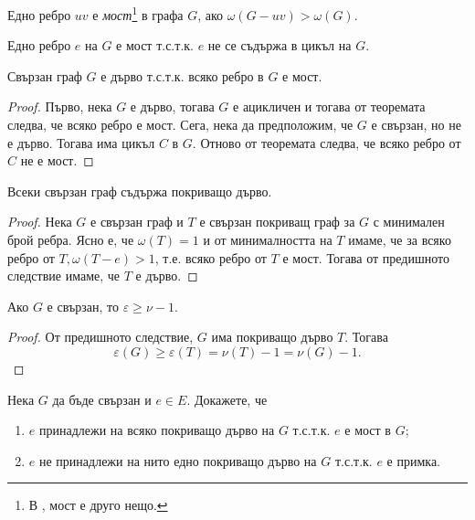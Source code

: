 Едно ребро $uv$ е {\em мост}\footnote{В \cite{GTWA}, мост е друго нещо.} в графа $G$, ако $\omega(G - uv) > \omega(G)$.
\begin{thm}
  Едно ребро $e$ на $G$ е мост т.с.т.к. $e$ не се съдържа в цикъл на $G$.
\end{thm}
\begin{corollary}
  Свързан граф $G$ е дърво т.с.т.к. всяко ребро в $G$ е мост.
\end{corollary}
\begin{proof}
  Първо, нека $G$ е дърво, тогава $G$ е ацикличен и тогава от теоремата следва, че всяко ребро е мост.
  Сега, нека да предположим, че $G$ е свързан, но не е дърво.
  Тогава има цикъл $C$ в $G$. Отново от теоремата следва, че всяко ребро от $C$ не е мост.
\end{proof}
\begin{corollary}
  Всеки свързан граф съдържа покриващо дърво.
\end{corollary}
\begin{proof}
  Нека $G$ е свързан граф и $T$ е свързан покриващ граф за $G$ с минимален брой ребра.
  Ясно е, че $\omega(T) = 1$ и от минималността на $T$ имаме, че за всяко ребро от $T, \omega(T - e) > 1$, т.е.
  всяко ребро от $T$ е мост.
  Тогава от предишното следствие имаме, че $T$ е дърво.
\end{proof}
\begin{corollary}
  Ако $G$ е свързан, то $\varepsilon \geq \nu - 1$.
\end{corollary}
\begin{proof}
  От предишното следствие, $G$ има покриващо дърво $T$.
  Тогава \[\varepsilon(G) \geq \varepsilon(T) = \nu(T) - 1 = \nu(G) - 1.\]
\end{proof}

\begin{problem}
  Нека $G$ да бъде свързан и $e\in E$. Докажете, че
\begin{enumerate}
  \item
    $e$ принадлежи на всяко покриващо дърво на $G$ т.с.т.к. $e$ е мост в $G$;
  \item
    $e$  не принадлежи на нито едно покриващо дърво на $G$ т.с.т.к. $e$ е примка.
\end{enumerate}
\end{problem}



